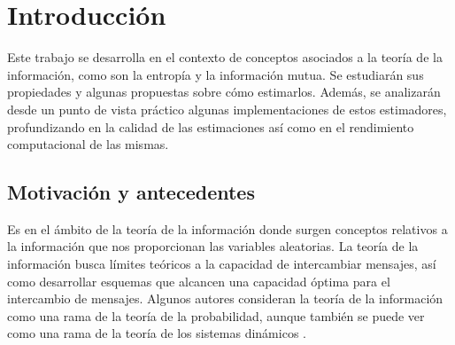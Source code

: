 \documentclass[12pt,a4paper]{report} %
\theoremstyle{definition}
\begin{document}


\doclicenseThis




\begin{otherlanguage}{british}
  
\end{otherlanguage}

\tableofcontents
\newpage


\chapter{Introducción}

Este trabajo se desarrolla en el contexto de conceptos asociados a la teoría de la información, como son la entropía y la información mutua. Se estudiarán sus propiedades y algunas propuestas sobre cómo estimarlos. Además, se analizarán desde un punto de vista práctico algunas implementaciones de estos estimadores, profundizando en la calidad de las estimaciones así como en el rendimiento computacional de las mismas.\\

\section{Motivación y antecedentes}

Es en el ámbito de la teoría de la información donde surgen conceptos relativos a la información que nos proporcionan las variables aleatorias. La teoría de la información busca límites teóricos a la capacidad de intercambiar mensajes, así como desarrollar esquemas que alcancen una capacidad óptima para el intercambio de mensajes. Algunos autores consideran la teoría de la información como una rama de la teoría de la probabilidad, aunque también se puede ver como una rama de la teoría de los sistemas dinámicos \cite{gray}.\\
\end{document}
